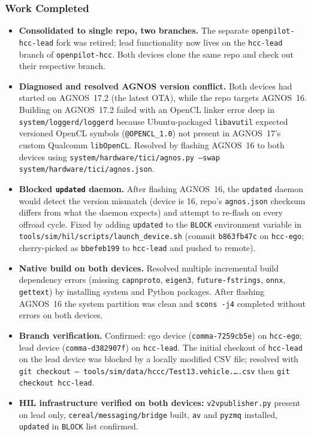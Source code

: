 \documentclass[12pt]{article}
\begin{document}
\subsubsection{Work Completed}
\begin{itemize}
  \item \textbf{Consolidated to single repo, two branches.} The separate \texttt{openpilot-hcc-lead} fork was retired; lead functionality now lives on the \texttt{hcc-lead} branch of \texttt{openpilot-hcc}. Both devices clone the same repo and check out their respective branch.
  \item \textbf{Diagnosed and resolved AGNOS version conflict.} Both devices had started on AGNOS~17.2 (the latest OTA), while the repo targets AGNOS~16. Building on AGNOS~17.2 failed with an OpenCL linker error deep in \texttt{system/loggerd/loggerd} because Ubuntu-packaged \texttt{libavutil} expected versioned OpenCL symbols (\texttt{@OPENCL\_1.0}) not present in AGNOS~17's custom Qualcomm \texttt{libOpenCL}. Resolved by flashing AGNOS~16 to both devices using \texttt{system/hardware/tici/agnos.py --swap system/hardware/tici/agnos.json}.
  \item \textbf{Blocked \texttt{updated} daemon.} After flashing AGNOS~16, the \texttt{updated} daemon would detect the version mismatch (device is 16, repo's \texttt{agnos.json} checksum differs from what the daemon expects) and attempt to re-flash on every offroad cycle. Fixed by adding \texttt{updated} to the \texttt{BLOCK} environment variable in \texttt{tools/sim/hil/scripts/launch\_device.sh} (commit \texttt{b863fb47c} on \texttt{hcc-ego}; cherry-picked as \texttt{bbefeb199} to \texttt{hcc-lead} and pushed to remote).
  \item \textbf{Native build on both devices.} Resolved multiple incremental build dependency errors (missing \texttt{capnproto}, \texttt{eigen3}, \texttt{future-fstrings}, \texttt{onnx}, \texttt{gettext}) by installing system and Python packages. After flashing AGNOS~16 the system partition was clean and \texttt{scons -j4} completed without errors on both devices.
  \item \textbf{Branch verification.} Confirmed: ego device (\texttt{comma-7259cb5e}) on \texttt{hcc-ego}; lead device (\texttt{comma-d382907f}) on \texttt{hcc-lead}. The initial checkout of \texttt{hcc-lead} on the lead device was blocked by a locally modified CSV file; resolved with \texttt{git checkout -- tools/sim/data/hccc/Test13.vehicle.\ldots.csv} then \texttt{git checkout hcc-lead}.
  \item \textbf{HIL infrastructure verified on both devices:} \texttt{v2vpublisher.py} present on lead only, \texttt{cereal/messaging/bridge} built, \texttt{av} and \texttt{pyzmq} installed, \texttt{updated} in \texttt{BLOCK} list confirmed.
\end{itemize}
\end{document}
